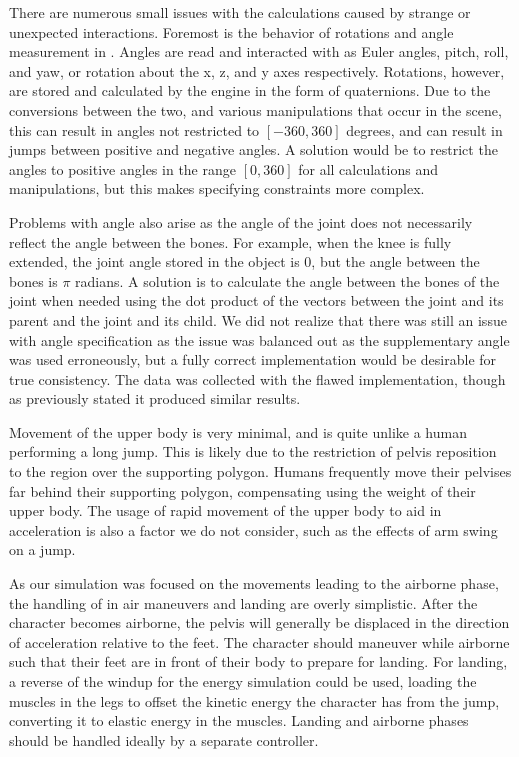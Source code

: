 There are numerous small issues with the calculations caused by strange or unexpected interactions.  Foremost is the behavior of rotations and angle measurement in \unity.  Angles are read and interacted with as Euler angles, pitch, roll, and yaw, or rotation about the x, z, and y axes respectively.  Rotations, however, are stored and calculated by the engine in the form of quaternions.  Due to the conversions between the two, and various manipulations that occur in the scene, this can result in angles not restricted to $[-360, 360]$ degrees, and can result in jumps between positive and negative angles.  A solution would be to restrict the angles to positive angles in the range $[0,360]$ for all calculations and manipulations, but this makes specifying constraints more complex.  

Problems with angle also arise as the angle of the joint does not necessarily reflect the angle between the bones.  For example, when the knee is fully extended, the joint angle stored in the object is 0, but the angle between the bones is $\pi$ radians.  A solution is to calculate the angle between the bones of the joint when needed using the dot product of the vectors between the joint and its parent and the joint and its child.  We did not realize that there was still an issue with angle specification as the issue was balanced out as the supplementary angle was used erroneously, but a fully correct implementation would be desirable for true consistency.  The data was collected with the flawed implementation, though as previously stated it produced similar results.

Movement of the upper body is very minimal, and is quite unlike a human performing a long jump.  This is likely due to the restriction of pelvis reposition to the region over the supporting polygon.  Humans frequently move their pelvises far behind their supporting polygon, compensating using the weight of their upper body.  The usage of rapid movement of the upper body to aid in acceleration is also a factor we do not consider, such as the effects of arm swing on a jump.

As our simulation was focused on the movements leading to the airborne phase, the handling of in air maneuvers and landing are overly simplistic.  After the character becomes airborne, the pelvis will generally be displaced in the direction of acceleration relative to the feet.  The character should maneuver while airborne such that their feet are in front of their body to prepare for landing.  For landing, a reverse of the windup for the energy simulation could be used, loading the muscles in the legs to offset the kinetic energy the character has from the jump, converting it to elastic energy in the muscles.  Landing and airborne phases should be handled ideally by a separate controller.

